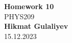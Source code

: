 \begin{titlepage}
    \begin{center}
    {\fontsize{40}{48}\selectfont \bfseries Homework 10} 
    \\\vspace{20pt}
    {\LARGE PHYS209} \\
    \vspace{20pt}
    \textbf{Hikmat Gulaliyev}
    \vspace{8pt}
    \\ 15.12.2023
    \end{center}
\end{titlepage}